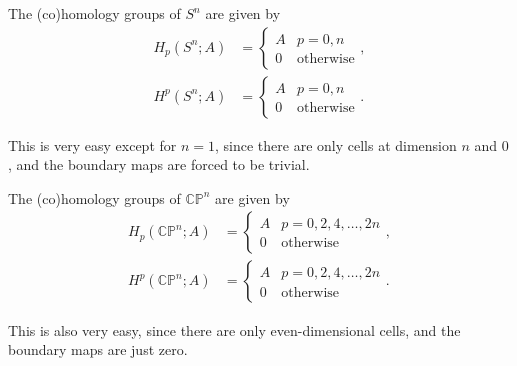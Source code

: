 \documentclass[12pt]{article}
\numberwithin{equation}{section}
\numberwithin{figure}{section}
\theoremstyle{remark}
\def\CP{\mathbb{CP}}
\begin{document}
\begin{example}
The (co)homology groups of $S^n$ are given by \begin{align}
H_p(S^n;A) &= \begin{cases} A & p=0,n \\ 0 & \text{otherwise} \end{cases}, \\
H^p(S^n;A) &= \begin{cases} A & p=0,n \\ 0 & \text{otherwise} \end{cases}.
\end{align}
\end{example}
This is very easy except for $n=1$, since there are only cells at dimension $n$ and $0$,
and the boundary maps are forced to be trivial.

\begin{example}
  \label{ex:cohoCPn}
The (co)homology groups of $\CP^n$ are given by \begin{align}
H_p(\CP^n;A) &= \begin{cases} A & p=0,2,4,\ldots,2n \\ 0 & \text{otherwise} \end{cases}, \\
H^p(\CP^n;A) &= \begin{cases} A & p=0,2,4,\ldots,2n \\ 0 & \text{otherwise} \end{cases}.
\end{align}
\end{example}
This is also very easy, since there are only even-dimensional cells,
and the boundary maps are just zero.
\end{document}
